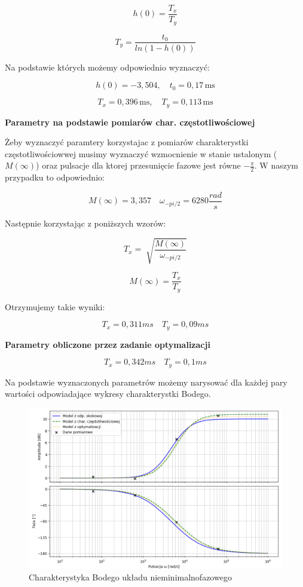 \documentclass[12pt,a4paper]{article}
\begin{document}
	\begin{equation}
		h(0) = \frac{T_x}{T_y}
	\end{equation}
	
	\begin{equation}
		T_y = \frac{t_0}{ln(1-h(0))}
	\end{equation}
	
	\noindent Na podstawie których możemy odpowiednio wyznaczyć:
	
	\[
	h(0) = -3,504, \quad
	t_0 = 0{,}17\,\text{ms}
	\]
	
	\[
	T_x = 0{,}396\,\text{ms}, \quad
	T_y = 0{,}113\,\text{ms}
	\]
	
	
	\textbf{Parametry na podstawie pomiarów char. częstotliwościowej}
	
	Żeby wyznaczyć paramtery korzystajac z pomiarów charakterystki częstotliwościowwej musimy wyznaczyć
	wzmocnienie w stanie ustalonym ($M(\infty)$) oraz pulsacje dla ktorej przesunięcie fazowe jest równe 
	$-\frac{\pi}{2}$. W naszym przypadku to odpowiednio:
	
	\[
	M(\infty) = 3,357 \quad
	\omega_{-pi/2} = 6280\frac{rad}{s}
	\]
	
	\noindent Następnie korzystając z poniższych wzorów:
	
	\begin{equation}
		T_x = \sqrt[]{\frac{M(\infty)}{\omega_{-pi/2}}}
	\end{equation}
	
	\begin{equation}
		M(\infty) = \frac{T_x}{T_y}
	\end{equation}
	
 	\noindent Otrzymujemy takie wyniki:
	
	\[
	T_x = 0,311ms \quad T_y = 0,09 ms
	\]
	
	\textbf{Parametry obliczone przez zadanie optymalizacji}
	
	\[
	T_x = 0,342ms \quad T_y = 0,1ms
	\]
	
	
	Na podstawie wyznaczonych parametrów możemy narysować dla każdej pary wartości odpowiadające 
	wykresy charakterystki Bodego.
	
	\begin{figure}[H]
		\centering
		\includegraphics[width=1\linewidth]{zdjecia/bode_nmf.png}
		\caption{Charakterystyka Bodego układu nieminimalnofazowego}
		\label{fig:bode_nmf}
	\end{figure}
	
\end{document}
